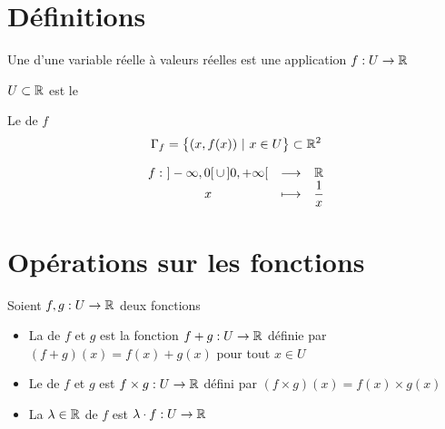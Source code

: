 \section{Définitions}

\begin{frame}

\begin{mydefinition}
Une  d'une variable réelle à valeurs réelles est une application 
$f:U\to \mathbb{R}$

\pause
$U\subset\mathbb{R}$ est le 
\end{mydefinition}

\pause 
Le  de $f$  \[
\Gamma_f=\big\{(x,f(x)) \ \vert \ x\in U\big\}\subset\mathbb{R}^2
\] 

\pause

\end{frame}



\begin{frame}

\begin{exemple}
\[
\begin{array}{ccc}
f: \ ]-\infty,0[ \,\cup \, ]0,+\infty[ &\longrightarrow& \mathbb{R} \\
 x &\longmapsto& \dfrac1x
 \end{array}
\]
\end{exemple}

\pause

  
\end{frame}
\section{Opérations sur les fonctions}

\begin{frame}
Soient $f,g:U\to \mathbb{R}$ deux fonctions
\begin{mydefinition}

\begin{itemize}
  \item<1-> La  de $f$ et $g$ est la fonction $f+g:U\to \mathbb{R}$ 
  définie par $(f+g)(x) = f(x) + g(x)$ pour tout $x\in U$ 
  \item<3-> Le  de $f$ et $g$ est $f\times g:U\to \mathbb{R}$ défini par 
  $(f\times g)(x) = f(x) \times g(x)$
  \item<4-> La  $\lambda\in\mathbb{R}$ 
  de $f$ est $\lambda\cdot f:U\to \mathbb{R}$
\end{itemize}
\end{mydefinition}

  
\end{frame}

